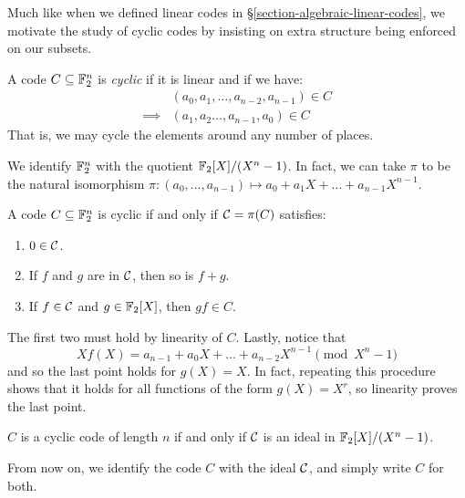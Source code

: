 \documentclass{article}
\begin{document}
Much like when we defined linear codes in \S\ref{section-algebraic-linear-codes}, we motivate the study of cyclic codes by insisting on extra structure being enforced on our subsets.

\begin{definition}
	\label{cyclic-code-original}
    A code $C \subseteq \mathbb{F}_2^n$ is \textit{cyclic} if it is linear and if we have:
    \begin{align*}
		&(a_0, a_1, \dots, a_{n-2}, a_{n-1}) \in C \\
		\implies
		&(a_1, a_2 \dots, a_{n-1}, a_0) \in C
	\end{align*}
	That is, we may cycle the elements around any number of places.
\end{definition}

\begin{note}
	We identify $\mathbb{F}_2^n$ with the quotient $\mathbb{F}_2[X] / (X^n - 1)$. In fact, we can take $\pi$ to be the natural isomorphism $\pi : (a_0, \dots, a_{n-1}) \mapsto a_0 + a_1X + \dots + a_{n-1}X^{n-1}$.
\end{note}

\begin{proposition}
    A code $C \subseteq \mathbb{F}_2^n$ is cyclic if and only if $\mathcal{C} = \pi(C)$ satisfies:
    \begin{enumerate}
	    \item $0 \in \mathcal{C}$.
	    \item If $f$ and $g$ are in $\mathcal{C}$, then so is $f + g$.
	    \item If $f \in \mathcal{C}$ and $g \in \mathbb{F}_2[X]$, then $gf \in C$.
	\end{enumerate}
\end{proposition}

\begin{prf}
    The first two must hold by linearity of $C$. Lastly, notice that
    \[
	X f(X) = a_{n-1} + a_{0}X + \dots + a_{n-2}X^{n-1} \pmod{X^n - 1}
	\]
	and so the last point holds for $g(X) = X$. In fact, repeating this procedure shows that it holds for all functions of the form $g(X) = X^r$, so linearity proves the last point.
\end{prf}

\begin{corollary}
    $C$ is a cyclic code of length $n$ if and only if $\mathcal{C}$ is an ideal in $\mathbb{F}_2[X] / (X^n - 1)$.
\end{corollary}

\begin{note}
	From now on, we identify the code $C$ with the ideal $\mathcal{C}$, and simply write $C$ for both.
\end{note}
\end{document}
